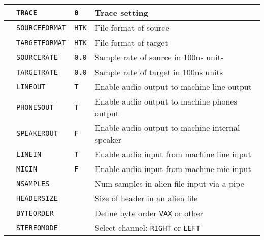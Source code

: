 \begin{center}
\tabletail{\hline}
\begin{supertabular}{|p{1.4cm}|l|l|p{6.6cm}|}

  & \texttt{TRACE} & \texttt{0} & Trace setting\\ \hline

 & \texttt{SOURCEFORMAT} & \texttt{HTK}
  & File format of source \\ 
 & \texttt{TARGETFORMAT} & \texttt{HTK} & File format of target \\ \hline

    
  & \texttt{SOURCERATE} & \texttt{0.0} & Sample rate of source in 100ns units \\ \hline

  
  & \texttt{TARGETRATE} & \texttt{0.0} & Sample rate of target in 100ns units \\ \hline

  & \texttt{LINEOUT} & \texttt{T}   & Enable audio output to machine line output \\ 
  & \texttt{PHONESOUT} & \texttt{T} & Enable audio output to machine phones output \\ 
  & \texttt{SPEAKEROUT} & \texttt{F}& Enable audio output to machine internal speaker \\ 
  & \texttt{LINEIN} & \texttt{T} & Enable audio input from machine line input \\ 
  & \texttt{MICIN}  & \texttt{F} & Enable audio input from machine mic input \\ \hline

  & \texttt{NSAMPLES} &  & Num samples in alien file input via a pipe\\ 
 & \texttt{HEADERSIZE}  &   & Size of header in an alien file\\ 
  & \texttt{BYTEORDER} &   & Define byte order \texttt{VAX} or other\\ 
  & \texttt{STEREOMODE} &   & Select channel: \texttt{RIGHT} or \texttt{LEFT} \\ \hline


\end{supertabular}
\end{center}

